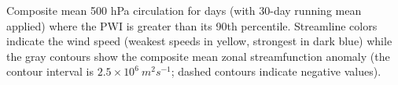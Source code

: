 \label{fig:pwi_spatial_summary}
Composite mean 500 hPa circulation for days (with 30-day running mean applied) where the PWI is greater than its 90th percentile. Streamline colors indicate the wind speed (weakest speeds in yellow, strongest in dark blue) while the gray contours show the composite mean zonal streamfunction anomaly (the contour interval is $2.5 \times 10^6 \: m^2 s^{-1}$; dashed contours indicate negative values). 